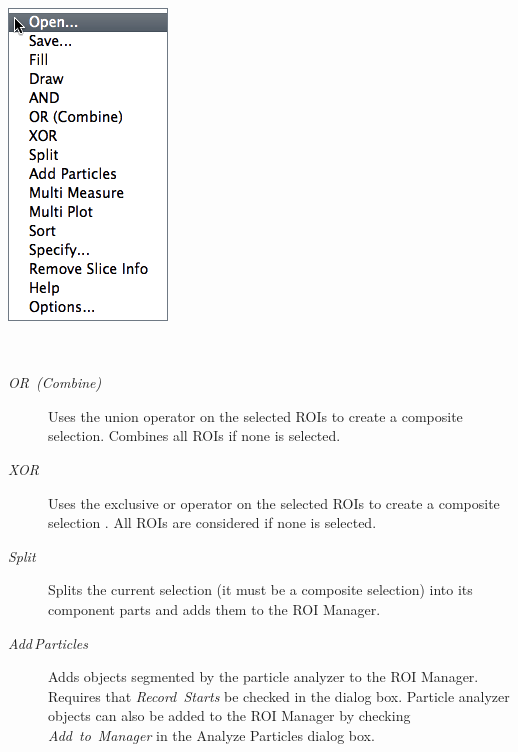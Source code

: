 \begin{minipage}[c][1\totalheight][t]{0.252\columnwidth}%
\begin{description}
\item [{\includegraphics[scale=0.55]{images/ROIManagerMenu}}]~\end{description}
%
\end{minipage}%
\begin{minipage}[c][1\totalheight][t]{0.748\columnwidth}%
\begin{description}
\item [{\emph{OR\ (Combine)}}] Uses the union operator on the selected
ROIs to create a composite selection. Combines all ROIs if none is
selected.
\item [{\emph{XOR}}] Uses the exclusive or operator on the selected ROIs
to create a composite selection \cite{C-RM-XOR}. All ROIs are considered
if none is selected.
\item [{\emph{Split}}] Splits the current selection (it must be a composite
selection) into its component parts and adds them to the ROI Manager.
\item [{\emph{Add\,Particles}}] Adds objects segmented by the particle
analyzer to the ROI Manager. Requires that \emph{Record~Starts} be
checked in the 
dialog box. Particle analyzer objects can also be added to the ROI
Manager by checking \emph{Add}\ \emph{to}\ \emph{Manager} in the
Analyze Particles dialog box.\end{description}
%
\end{minipage}

